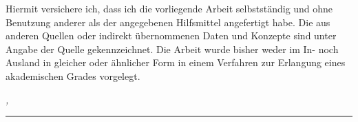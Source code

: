 %
\label{sec:declaration}
\thispagestyle{empty}

Hiermit versichere ich, dass ich die vorliegende Arbeit selbstständig und ohne Benutzung anderer als der angegebenen Hilfsmittel angefertigt habe. Die aus anderen Quellen oder indirekt übernommenen Daten und Konzepte sind unter Angabe der Quelle gekennzeichnet. Die Arbeit wurde bisher weder im In- noch Ausland in gleicher oder ähnlicher Form in einem Verfahren zur Erlangung eines akademischen Grades vorgelegt.

\bigskip

\noindent\textit{\thesisUniversityCity, \thesisDate}

\smallskip

\begin{flushright}
	\begin{minipage}{5cm}
		\rule{\textwidth}{1pt}
		\centering\thesisName
	\end{minipage}
\end{flushright}


